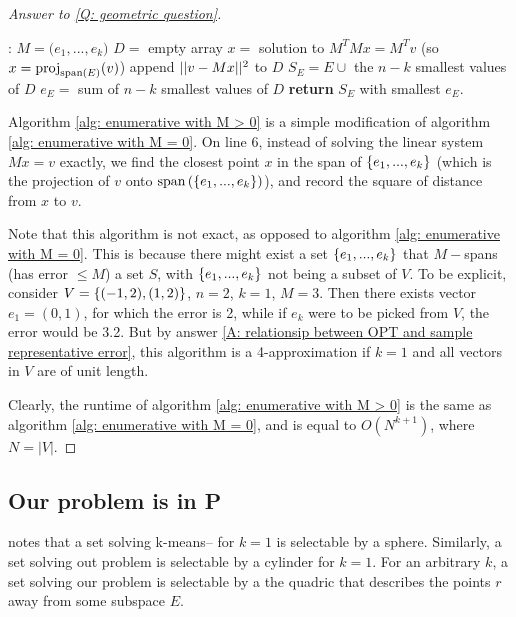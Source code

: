 \documentclass{article}
\begin{document}
\begin{proof}[Answer to \ref{Q: geometric question}]
\begin{algorithm}[H]
      \caption{}\label{alg: enumerative with M > 0}
    \begin{algorithmic}[1]
    :
        \State $M = \Big(e_1,...,e_k\Big)$
        \State $D = $ empty array
            \State $x=$ solution to $M^TMx = M^Tv$ (so $x=\text{proj}_{\text{span}\left(E\right)}(v)$)
            \State append $||v-Mx||^2$ to $D$
        \EndFor
        \State $S_E = E\cup$ the $n-k$ smallest values of $D$
        \State $e_E = $ sum of $n-k$ smallest values of $D$
    \EndFor
    \State \textbf{return} $S_E$ with smallest $e_E$.
    \EndProcedure
    \end{algorithmic}
\end{algorithm}
Algorithm \ref{alg: enumerative with M > 0} is a simple modification of algorithm \ref{alg: enumerative with M = 0}. On line 6, instead of solving the linear system $Mx = v$ exactly, we find the closest point $x$ in the span of $\left\{e_1,...,e_k\right\}$ (which is the projection of $v$ onto $\text{span}\left(\left\{e_1,...,e_k\right\}\right)$), and record the square of distance from $x$ to $v$.

Note that this algorithm is not exact, as opposed to algorithm \ref{alg: enumerative with M = 0}. This is because there might exist a set $\left\{e_1,...,e_k\right\}$ that $M-$spans (has error $\leq M$) a set $S$, with $\left\{e_1,...,e_k\right\}$ not being a subset of $V$. To be explicit, consider $V=\left\{(-1,2),(1,2)\right\}$, $n=2$, $k=1$, $M = 3$. Then there exists vector $e_1=(0,1)$, for which the error is 2, while if $e_k$ were to be picked from $V$, the error would be 3.2. But by answer \ref{A: relationsip between OPT and sample representative error}, this algorithm is a 4-approximation if $k=1$ and all vectors in $V$ are of unit length.

Clearly, the runtime of algorithm \ref{alg: enumerative with M > 0} is the same as algorithm \ref{alg: enumerative with M = 0}, and is equal to $O(N^{k+1})$, where $N = |V|$.
\end{proof}

\subsection{Our problem is in \textbf{P}}\label{subsection: our problem is in P}
\cite{chawla2013k} notes that a set solving k-means-- for $k=1$ is selectable by a sphere. Similarly, a set solving out problem is selectable by a cylinder for $k=1$. For an arbitrary $k$, a set solving our problem is selectable by a the quadric that describes the points $r$ away from some subspace $E$.
\end{document}

